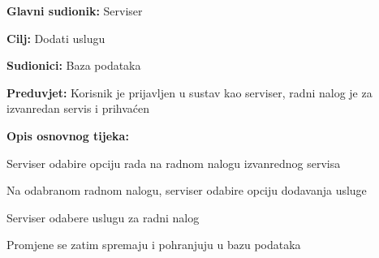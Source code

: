 \noindent {}
\begin{packed_item}
	
	\item \textbf{Glavni sudionik: } Serviser
	\item  \textbf{Cilj:} Dodati uslugu
	\item  \textbf{Sudionici:} Baza podataka
	\item  \textbf{Preduvjet:} Korisnik je prijavljen u sustav kao serviser, radni nalog je
	za izvanredan servis i prihvaćen
	\item  \textbf{Opis osnovnog tijeka:}
	
	\item[] \begin{packed_enum}
		
		\item Serviser odabire opciju rada na radnom nalogu izvanrednog servisa
		\item Na odabranom radnom nalogu, serviser odabire opciju dodavanja usluge
		\item Serviser odabere uslugu za radni nalog
		\item Promjene se zatim spremaju i pohranjuju u bazu podataka
		
	\end{packed_enum}
\end{packed_item}

